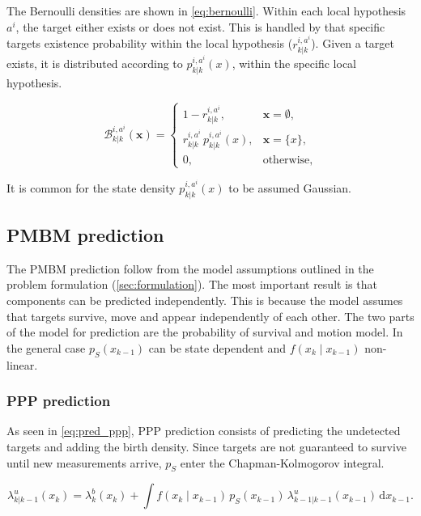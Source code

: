 The Bernoulli densities are shown in \autoref{eq:bernoulli}. Within each local hypothesis $a^i$, the target either exists or does not exist. This is handled by that specific targets existence probability within the local hypothesis ($r^{i,a^i}_{k|k}$). Given a target exists, it is distributed according to $p^{i,a^i}_{k|k}(x)$, within the specific local hypothesis.

\begin{equation}
  \mathcal{B}^{i,a^i}_{k|k}(\mathbf{x}) =
  \begin{cases}
    1 - r^{i,a^i}_{k|k}, & \mathbf{x} = \emptyset, \\
    r^{i,a^i}_{k|k}\, p^{i,a^i}_{k|k}(x), & \mathbf{x} = \{x\}, \\
    0, & \text{otherwise},
  \end{cases}
  \label{eq:bernoulli}
\end{equation}

It is common for the state density $p^{i,a^i}_{k|k}(x)$ to be assumed Gaussian.


\subsection{PMBM prediction}
The PMBM prediction follow from the model assumptions outlined in the problem formulation (\autoref{sec:formulation}). The most important result is that components can be predicted independently. This is because the model assumes that targets survive, move and appear independently of each other. The two parts of the model for prediction are the probability of survival and motion model. In the general case $p_S(x_{k-1})$ can be state dependent and $f(x_k \mid x_{k-1})$ non-linear.
\medskip

\subsubsection{PPP prediction}
As seen in \autoref{eq:pred_ppp}, PPP prediction consists of predicting the undetected targets and adding the birth density. Since targets are not guaranteed to survive until new measurements arrive, $p_S$ enter the Chapman-Kolmogorov integral.

\begin{equation}
  \lambda^u_{k|k-1}(x_k) = \lambda^b_k(x_k)
    + \int f(x_k \mid x_{k-1})\, p_S(x_{k-1})\, \lambda^u_{k-1|k-1}(x_{k-1})\,\mathrm{d}x_{k-1}.
  \label{eq:pred_ppp}
\end{equation}

